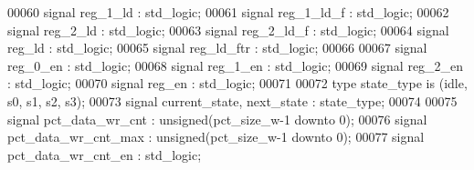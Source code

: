 \begin{DoxyCode}
00060 \textcolor{keywordflow}{signal} \textcolor{vhdlchar}{reg_1_ld}   \textcolor{vhdlchar}{:} \textcolor{comment}{std\_logic};
00061 \textcolor{keywordflow}{signal} \textcolor{vhdlchar}{reg_1_ld_f} \textcolor{vhdlchar}{:} \textcolor{comment}{std\_logic};
00062 \textcolor{keywordflow}{signal} \textcolor{vhdlchar}{reg_2_ld}   \textcolor{vhdlchar}{:} \textcolor{comment}{std\_logic};
00063 \textcolor{keywordflow}{signal} \textcolor{vhdlchar}{reg_2_ld_f} \textcolor{vhdlchar}{:} \textcolor{comment}{std\_logic};
00064 \textcolor{keywordflow}{signal} \textcolor{vhdlchar}{reg_ld}     \textcolor{vhdlchar}{:} \textcolor{comment}{std\_logic};
00065 \textcolor{keywordflow}{signal} \textcolor{vhdlchar}{reg_ld_ftr}   \textcolor{vhdlchar}{:} \textcolor{comment}{std\_logic};
00066 
00067 \textcolor{keywordflow}{signal} \textcolor{vhdlchar}{reg_0_en}   \textcolor{vhdlchar}{:} \textcolor{comment}{std\_logic};
00068 \textcolor{keywordflow}{signal} \textcolor{vhdlchar}{reg_1_en}   \textcolor{vhdlchar}{:} \textcolor{comment}{std\_logic};
00069 \textcolor{keywordflow}{signal} \textcolor{vhdlchar}{reg_2_en}   \textcolor{vhdlchar}{:} \textcolor{comment}{std\_logic};
00070 \textcolor{keywordflow}{signal} \textcolor{vhdlchar}{reg_en}     \textcolor{vhdlchar}{:} \textcolor{comment}{std\_logic};
00071 
00072 \textcolor{keywordflow}{type} \textcolor{vhdlchar}{state_type} \textcolor{keywordflow}{is} \textcolor{vhdlchar}{(}\textcolor{vhdlchar}{idle}\textcolor{vhdlchar}{,} \textcolor{vhdlchar}{s0}\textcolor{vhdlchar}{,} \textcolor{vhdlchar}{s1}\textcolor{vhdlchar}{,} \textcolor{vhdlchar}{s2}\textcolor{vhdlchar}{,} \textcolor{vhdlchar}{s3}\textcolor{vhdlchar}{)};
00073 \textcolor{keywordflow}{signal} \textcolor{vhdlchar}{current_state}\textcolor{vhdlchar}{,} \textcolor{vhdlchar}{next_state} \textcolor{vhdlchar}{:} \textcolor{vhdlchar}{state_type};
00074 
00075 \textcolor{keywordflow}{signal} \textcolor{vhdlchar}{pct_data_wr_cnt}     \textcolor{vhdlchar}{:} \textcolor{comment}{unsigned}\textcolor{vhdlchar}{(}\textcolor{vhdlchar}{pct_size_w}\textcolor{vhdlchar}{-}\textcolor{vhdllogic}{}\textcolor{vhdllogic}{1} \textcolor{keywordflow}{downto} \textcolor{vhdllogic}{}\textcolor{vhdllogic}{0}\textcolor{vhdlchar}{)};
00076 \textcolor{keywordflow}{signal} \textcolor{vhdlchar}{pct_data_wr_cnt_max} \textcolor{vhdlchar}{:} \textcolor{comment}{unsigned}\textcolor{vhdlchar}{(}\textcolor{vhdlchar}{pct_size_w}\textcolor{vhdlchar}{-}\textcolor{vhdllogic}{}\textcolor{vhdllogic}{1} \textcolor{keywordflow}{downto} \textcolor{vhdllogic}{}\textcolor{vhdllogic}{0}\textcolor{vhdlchar}{)};
00077 \textcolor{keywordflow}{signal} \textcolor{vhdlchar}{pct_data_wr_cnt_en}  \textcolor{vhdlchar}{:} \textcolor{comment}{std\_logic};

\end{DoxyCode}
